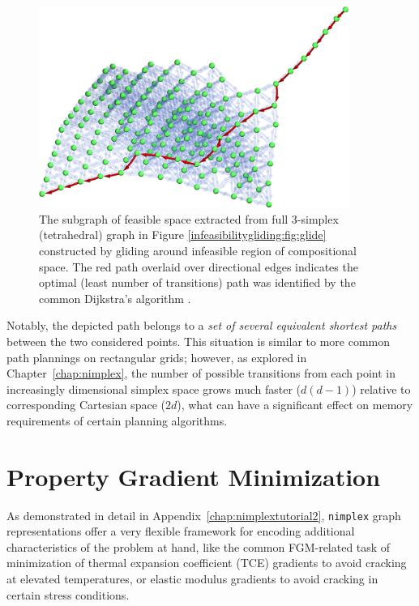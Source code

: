 \begin{figure}[H]
    \centering
    \includegraphics[width=0.9\textwidth]{pathplanning/InfeasibilityGliding_Feasible.png}
    \caption{The subgraph of feasible space extracted from full 3-simplex (tetrahedral) graph in Figure \ref{infeasibilitygliding:fig:glide} constructed by gliding around infeasible region of compositional space. The red path overlaid over directional edges indicates the optimal (least number of transitions) path was identified by the common Dijkstra's algorithm \cite{Dijkstra1959AGraphs}.}
    \label{pathplan:fig:shortestpath}
\end{figure}

Notably, the depicted path belongs to a \emph{set of several equivalent shortest paths} between the two considered points. This situation is similar to more common path plannings on rectangular grids; however, as explored in Chapter~\ref{chap:nimplex}, the number of possible transitions from each point in increasingly dimensional simplex space grows much faster ($d(d-1)$) relative to corresponding Cartesian space ($2d$), what can have a significant effect on memory requirements of certain planning algorithms.

\section{Property Gradient Minimization} \label{pathplan:sec:gradientmin}

As demonstrated in detail in Appendix~\ref{chap:nimplextutorial2}, \texttt{nimplex} graph representations offer a very flexible framework for encoding additional characteristics of the problem at hand, like the common FGM-related task of minimization of thermal expansion coefficient (TCE) gradients \cite{Kirk2021ComputationalMonotonicity} to avoid cracking at elevated temperatures, or elastic modulus gradients to avoid cracking in certain stress conditions.

